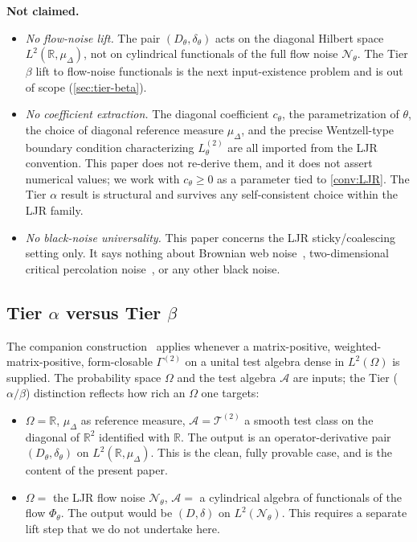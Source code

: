 \documentclass[11pt,reqno]{amsart}
\theoremstyle{plain}
\theoremstyle{definition}
\theoremstyle{remark}
\newcommand{\R}{\mathbb{R}}
\newcommand{\cA}{\mathcal A}
\newcommand{\cN}{\mathcal N}
\newcommand{\cT}{\mathcal T}
\newcommand{\Dth}{D_{\theta}}
\newcommand{\divth}{\delta_{\theta}}
\begin{document}
\textbf{Not claimed.}
\begin{itemize}
\item \emph{No flow-noise lift.} The pair $(\Dth,\divth)$ acts on
the diagonal Hilbert space $L^{2}(\R,\mu_{\Delta})$, not on
cylindrical functionals of the full flow noise $\cN_{\theta}$.
The Tier $\beta$ lift to flow-noise functionals is the next
input-existence problem and is out of scope (\cref{sec:tier-beta}).
\item \emph{No coefficient extraction.} The diagonal coefficient
$c_{\theta}$, the parametrization of $\theta$, the choice of
diagonal reference measure $\mu_{\Delta}$, and the precise
Wentzell-type boundary condition characterizing $L^{(2)}_{\theta}$
are all imported from the LJR convention. This paper does not
re-derive them, and it does not assert numerical values; we work
with $c_{\theta}\ge 0$ as a parameter tied to \cref{conv:LJR}.
The Tier $\alpha$ result is structural and survives any
self-consistent choice within the LJR family.
\item \emph{No black-noise universality.} This paper concerns the
LJR sticky/coalescing setting only. It says nothing about
Brownian web noise~\cite{SSS2017,Tsirelson2004}, two-dimensional
critical percolation noise~\cite{SchrammSmirnov2011}, or any
other black noise.
\end{itemize}

\subsection{Tier \texorpdfstring{$\alpha$}{alpha} versus Tier \texorpdfstring{$\beta$}{beta}}\label{sec:intro-tiers}

The companion construction~\cite{GammaHierarchyDivergence}
applies whenever a matrix-positive, weighted-matrix-positive,
form-closable $\Gamma^{(2)}$ on a unital test algebra dense in
$L^{2}(\Omega)$ is supplied. The probability space $\Omega$ and
the test algebra $\cA$ are inputs; the Tier ($\alpha/\beta$)
distinction reflects how rich an $\Omega$ one targets:
\begin{itemize}
\item[\textbf{$\alpha$.}] $\Omega=\R$, $\mu_{\Delta}$ as
reference measure, $\cA=\cT^{(2)}$ a smooth test class on the
diagonal of $\R^{2}$ identified with $\R$. The output is an
operator-derivative pair $(\Dth,\divth)$ on
$L^{2}(\R,\mu_{\Delta})$. This is the clean, fully provable
case, and is the content of the present paper.
\item[\textbf{$\beta$.}] $\Omega=$ the LJR flow noise
$\cN_{\theta}$, $\cA=$ a cylindrical algebra of functionals of
the flow $\Phi_{\theta}$. The output would be $(D,\delta)$ on
$L^{2}(\cN_{\theta})$. This requires a separate lift step that
we do not undertake here.
\end{itemize}
\end{document}
